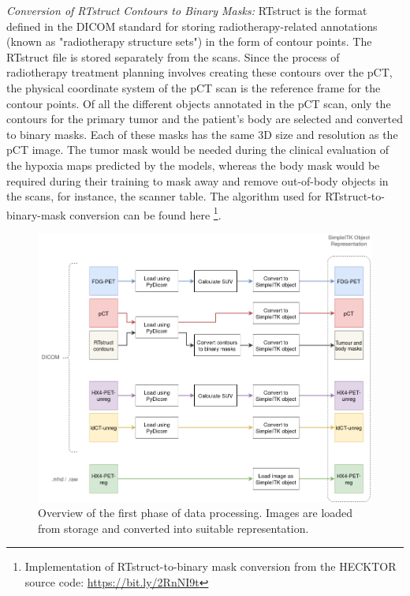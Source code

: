 \vspace{4mm}
\noindent
\textit{Conversion of RTstruct Contours to Binary Masks:} RTstruct is the format defined in the DICOM standard for storing radiotherapy-related annotations (known as "radiotherapy structure sets") in the form of contour points. The RTstruct file is stored separately from the scans. Since the process of radiotherapy treatment planning involves creating these contours over the pCT, the physical coordinate system of the pCT scan is the reference frame for the contour points. Of all the different objects annotated in the pCT scan, only the contours for the primary tumor and the patient's body are selected and converted to binary masks. Each of these masks has the same 3D size and resolution as the pCT image. The tumor mask would be needed during the clinical evaluation of the hypoxia maps predicted by the models, whereas the body mask would be required during their training to mask away and remove out-of-body objects in the scans, for instance, the scanner table. The algorithm used for RTstruct-to-binary-mask conversion can be found here \footnote{Implementation of RTstruct-to-binary mask conversion from the HECKTOR source code: \url{https://bit.ly/2RnNI9t}}.

\begin{figure}[h!]
    \centering
    \includegraphics[width=0.9\linewidth]{figures/Data/data_processing_overview-step_1.png}
    \caption{Overview of the first phase of data processing. Images are loaded from storage and converted into suitable representation.}
    \label{fig:data_proc_overview_1}
\end{figure}

